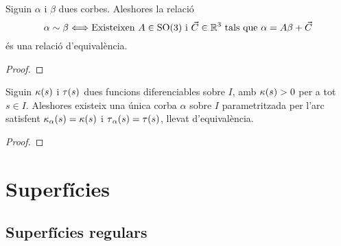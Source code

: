 \documentclass[../../Main.tex]{subfiles}
\begin{document}
	\begin{lemma}
		\label{lemma:Teorema Fonamental de la teoria local de corbes}
		Siguin \(\alpha\) i \(\beta\) dues corbes. Aleshores la relació
		\[\alpha\sim\beta \Longleftrightarrow \text{Existeixen }A\in\operatorname{SO}(3)\text{ i }\vec{C}\in\mathbb{R}^{3}\text{ tals que }\alpha=A\beta+\vec{C}\]
		és una relació d'equivalència.
		\begin{proof}
		\end{proof}
	\end{lemma}
	\begin{theorem}
		\label{thm:Teorema Fonamental de la teoria local del corbes}
		Siguin \(\operatorname{\kappa}(s)\) i \(\operatorname{\tau}(s)\) dues funcions diferenciables sobre \(I\), amb \(\operatorname{\kappa}(s)>0\) per a tot \(s\in I\). Aleshores existeix una única corba \(\alpha\) sobre \(I\) parametritzada per l'arc satisfent \(\operatorname{\kappa}_{\alpha}(s)=\operatorname{\kappa}(s)\) i \(\operatorname{\tau}_{\alpha}(s)=\operatorname{\tau}(s)\), llevat d'equivalència. %
		\begin{proof}
		\end{proof}
	\end{theorem}
\chapter{Superfícies}
\section{Superfícies regulars}
\end{document}
